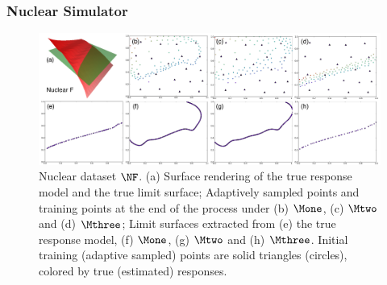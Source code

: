 
\subsubsection{Nuclear Simulator}

\begin{figure}[!ht]
\centering
\includegraphics[width=1.0\textwidth]{figs/chap5/nuclear-F.pdf}
\caption{Nuclear dataset $\protect\NF$.
(a) Surface rendering of the true response model and the true limit surface; Adaptively sampled points and training points at the end of the process under (b) $\protect\Mone$, (c) $\protect\Mtwo$ and (d) $\protect\Mthree$;
Limit surfaces extracted from (e) the true response model, (f) $\protect\Mone$, (g) $\protect\Mtwo$ and (h) $\protect\Mthree$.
Initial training (adaptive sampled) points are solid triangles (circles), colored by true (estimated) responses.}
\label{fig:nuclear-F}
\end{figure}

